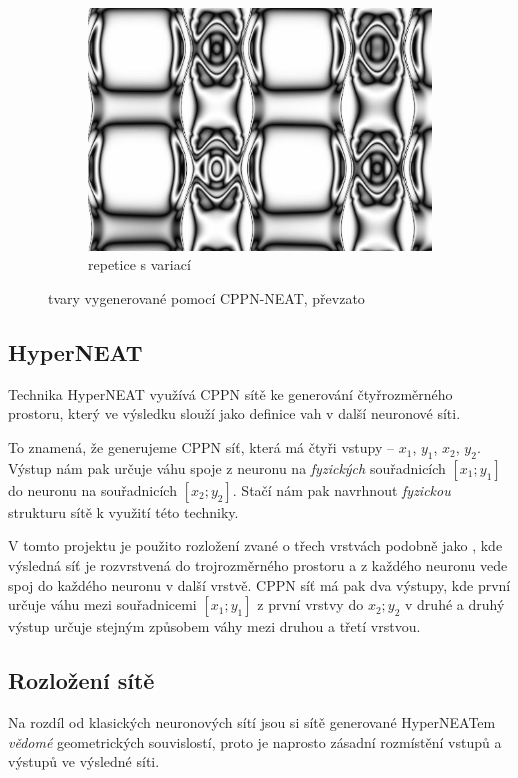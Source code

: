\documentclass[a4]{article}
\begin{document}
\begin{figure}
\begin{subfigure}[b]{0.3\textwidth}
        \includegraphics[width=\textwidth]{cppn3}
        \caption{repetice s variací}
        \label{fig:repvar}
    \end{subfigure}
    \caption{tvary vygenerované pomocí CPPN-NEAT, převzato\cite{hyperneat}}\label{fig:cppn}
\end{figure}
\subsection{HyperNEAT}
Technika HyperNEAT\cite{hyperneat} využívá CPPN sítě ke generování čtyřrozměrného prostoru, který ve výsledku slouží jako definice vah v další neuronové síti.\par
To znamená, že generujeme CPPN síť, která má čtyři vstupy -- $x_1$, $y_1$, $x_2$, $y_2$. Výstup nám pak určuje váhu spoje z neuronu na \emph{fyzických} souřadnicích $[x_1;y_1]$ do neuronu na souřadnicích $[x_2;y_2]$. Stačí nám pak navrhnout \emph{fyzickou} strukturu sítě k využití této techniky.\par
V tomto projektu je použito rozložení zvané \emph{}\cite{hyperneat} o třech vrstvách podobně jako \cite{clunegait}, kde výsledná síť je rozvrstvená do trojrozměrného prostoru a z každého neuronu vede spoj do každého neuronu v další vrstvě. CPPN síť má pak dva výstupy, kde první určuje váhu mezi souřadnicemi $[x_1;y_1]$ z první vrstvy do $x_2;y_2$ v druhé a druhý výstup určuje stejným způsobem váhy mezi druhou a třetí vrstvou.\par
\subsection{Rozložení sítě}
Na rozdíl od klasických neuronových sítí jsou si sítě generované HyperNEATem \emph{vědomé} geometrických souvislostí\cite{hyperneat}, proto je naprosto zásadní rozmístění vstupů a výstupů ve výsledné síti.\par
\end{document}
